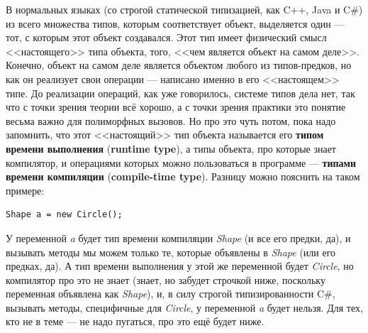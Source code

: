 \documentclass{../../text-style}
\begin{document}
В нормальных языках (со строгой статической типизацией, как C++, Java и C\#) из всего множества типов, которым соответствует объект, выделяется один --- тот, с которым этот объект создавался. Этот тип имеет физический смысл <<настоящего>> типа объекта, того, <<чем является объект на самом деле>>. Конечно, объект на самом деле является объектом любого из типов-предков, но как он реализует свои операции --- написано именно в его <<настоящем>> типе. До реализации операций, как уже говорилось, системе типов дела нет, так что с точки зрения теории всё хорошо, а с точки зрения практики это понятие весьма важно для полиморфных вызовов. Но про это чуть потом, пока надо запомнить, что этот <<настоящий>> тип объекта называется его \textbf{типом времени выполнения} (\textbf{runtime type}), а типы объекта, про которые знает компилятор, и операциями которых можно пользоваться в программе --- \textbf{типами времени компиляции} (\textbf{compile-time type}). Разницу можно пояснить на таком примере:

\begin{verbatim}
Shape a = new Circle();
\end{verbatim}

У переменной \textit{a} будет тип времени компиляции \textit{Shape} (и все его предки, да), и вызывать методы мы можем только те, которые объявлены в \textit{Shape} (или его предках, да). А тип времени выполнения у этой же переменной будет \textit{Circle}, но компилятор про это не знает (знает, но забудет строчкой ниже, поскольку переменная объявлена как \textit{Shape}), и, в силу строгой типизированности C\#, вызывать методы, специфичные для \textit{Circle}, у переменной \textit{a} будет нельзя. Для тех, кто не в теме --- не надо пугаться, про это ещё будет ниже.
\end{document}
